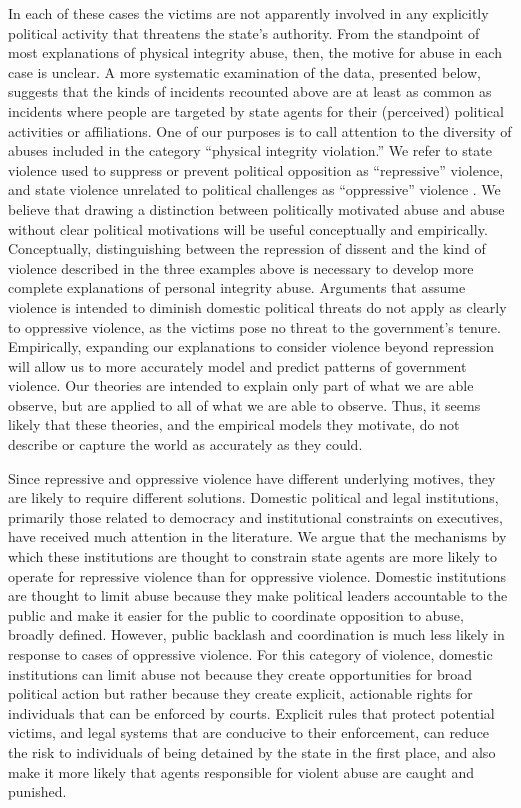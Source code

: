 \documentclass[12pt]{article}
\begin{document}
In each of these cases the victims are not apparently involved in any explicitly political activity that threatens the state's authority. From the standpoint of most explanations of physical integrity abuse, then, the motive for abuse in each case is unclear. A more systematic examination of the data, presented below, suggests that the kinds of incidents recounted above are at least as common as incidents where people are targeted by state agents for their (perceived) political activities or affiliations. One of our purposes is to call attention to the diversity of abuses included in the category ``physical integrity violation.'' We refer to state violence used to suppress or prevent political opposition as ``repressive'' violence, and state violence unrelated to political challenges as ``oppressive'' violence \citep{Bisselletal1978}. We believe that drawing a distinction between politically motivated abuse and abuse without clear political motivations will be useful conceptually and empirically. Conceptually, distinguishing between the repression of dissent and the kind of violence described in the three examples above is necessary to develop more complete explanations of personal integrity abuse. Arguments that assume violence is intended to diminish domestic political threats do not apply as clearly to oppressive violence, as the victims pose no threat to the government's tenure. Empirically, expanding our explanations to consider violence beyond repression will allow us to more accurately model and predict patterns of government violence. Our theories are intended to explain only part of what we are able observe, but are applied to all of what we are able to observe. Thus, it seems likely that these theories, and the empirical models they motivate, do not describe or capture the world as accurately as they could.   

Since repressive and oppressive violence have different underlying motives, they are likely to require different solutions. Domestic political and legal institutions, primarily those related to democracy and institutional constraints on executives, have received much attention in the literature. We argue that the mechanisms by which these institutions are thought to constrain state agents are more likely to operate for repressive violence than for oppressive violence. Domestic institutions are thought to limit abuse because they make political leaders accountable to the public and make it easier for the public to coordinate opposition to abuse, broadly defined. However, public backlash and coordination is much less likely in response to cases of oppressive violence. For this category of violence, domestic institutions can limit abuse not because they create opportunities for broad political action but rather because they create explicit, actionable rights for individuals that can be enforced by courts. Explicit rules that protect potential victims, and legal systems that are conducive to their enforcement, can reduce the risk to individuals of being detained by the state in the first place, and also make it more likely that agents responsible for violent abuse are caught and punished.    
\end{document}
